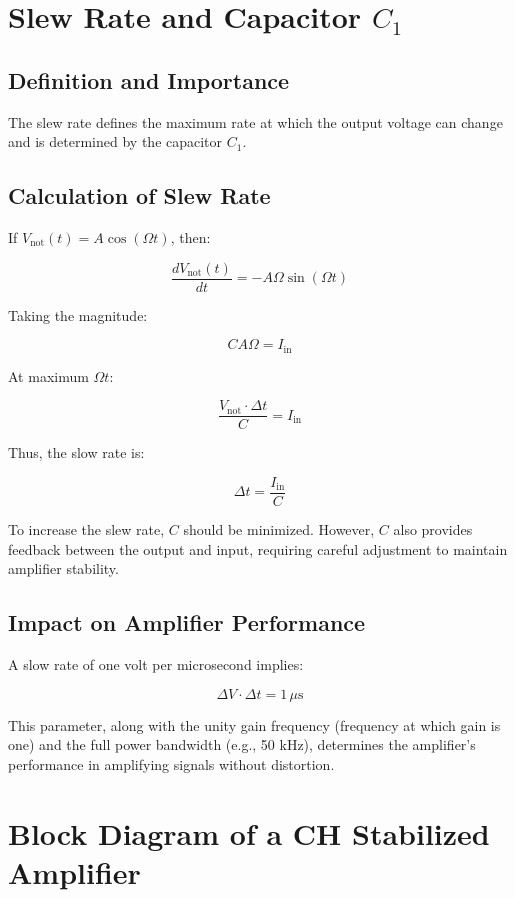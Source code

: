 \section{Slew Rate and Capacitor \( C_1 \)}

\subsection{Definition and Importance}

The slew rate defines the maximum rate at which the output voltage can change and is determined by the capacitor \( C_1 \).

\subsection{Calculation of Slew Rate}

If \( V_{\text{not}}(t) = A \cos(\Omega t) \), then:

\[
\frac{dV_{\text{not}}(t)}{dt} = -A \Omega \sin(\Omega t)
\]

Taking the magnitude:

\[
C A \Omega = I_{\text{in}}
\]

At maximum \( \Omega t \):

\[
\frac{V_{\text{not}} \cdot \Delta t}{C} = I_{\text{in}}
\]

Thus, the slow rate is:

\[
\Delta t = \frac{I_{\text{in}}}{C}
\]

To increase the slew rate, \( C \) should be minimized. However, \( C \) also provides feedback between the output and input, requiring careful adjustment to maintain amplifier stability.

\subsection{Impact on Amplifier Performance}

A slow rate of one volt per microsecond implies:

\[
\Delta V \cdot \Delta t = 1 \, \mu\text{s}
\]

This parameter, along with the unity gain frequency (frequency at which gain is one) and the full power bandwidth (e.g., 50 kHz), determines the amplifier's performance in amplifying signals without distortion.

\section{Block Diagram of a CH Stabilized Amplifier}


